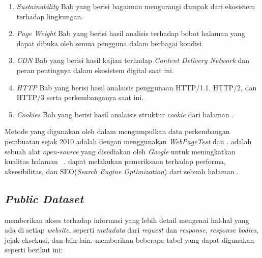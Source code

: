\begin{enumerate}
    \item \textit{Sustainability} Bab yang berisi bagaiman mengurangi dampak dari ekosistem \web terhadap lingkungan.
    \item \textit{Page Weight} Bab yang berisi hasil analisis terhadap bobot halaman yang dapat dibuka oleh semua pengguna dalam berbagai kondisi.
    \item \textit{CDN} Bab yang berisi hasil kajian terhadap \textit{Content Delivery Network} dan peran pentingnya dalam ekosistem digital saat ini.
    \item \textit{HTTP} Bab yang berisi hasil analaisis penggunaan HTTP/1.1, HTTP/2, dan HTTP/3 serta perkembanganya saat ini.
    \item \textit{Cookies} Bab yang berisi hasil analaisis struktur \textit{cookie} dari halaman \web.
\end{enumerate}

Metode yang digunakan oleh \http dalam mengumpulkan data perkembangan pembuatan \web sejak 2010 adalah dengan menggunakan \textit{WebPageTest} dan \light. \light adalah sebuah alat \textit{open-source} yang disediakan oleh \textit{Google} untuk meningkatkan kualitas halaman \web~\cite{lighthouse}. \light dapat melakukan pemeriksaan terhadap performa, aksesibilitas, dan SEO(\textit{Search Engine Optimization}) dari sebuah halaman \web.

\subsection{\textit{Public Dataset}}
\label{subsec:pd}
\http memberikan akses terhadap informasi yang lebih detail mengenai hal-hal yang ada di setiap \textit{website}, seperti \textit{metadata} dari \textit{request} dan \textit{response}, \textit{response bodies}, jejak eksekusi, dan lain-lain. \http memberikan beberapa tabel yang dapat digunakan seperti berikut ini:

